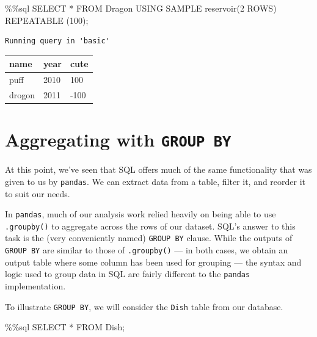 \documentclass[
  letterpaper,
  DIV=11,
  numbers=noendperiod]{scrreprt}
\newenvironment{Shaded}{\begin{snugshade}}{\end{snugshade}}
\newcommand{\DecValTok}[1]{\textcolor[rgb]{0.68,0.00,0.00}{#1}}
\newcommand{\NormalTok}[1]{\textcolor[rgb]{0.00,0.23,0.31}{#1}}
\newcommand{\OperatorTok}[1]{\textcolor[rgb]{0.37,0.37,0.37}{#1}}
\begin{document}
\begin{Shaded}
\begin{Highlighting}[]
\OperatorTok{\%\%}\NormalTok{sql}
\NormalTok{SELECT }\OperatorTok{*}
\NormalTok{FROM Dragon USING SAMPLE reservoir(}\DecValTok{2}\NormalTok{ ROWS) REPEATABLE (}\DecValTok{100}\NormalTok{)}\OperatorTok{;}
\end{Highlighting}
\end{Shaded}

\begin{verbatim}
Running query in 'basic'
\end{verbatim}

\begin{longtable}[]{@{}lll@{}}
\toprule\noalign{}
name & year & cute \\
\midrule\noalign{}
\endhead
\bottomrule\noalign{}
\endlastfoot
puff & 2010 & 100 \\
drogon & 2011 & -100 \\
\end{longtable}

\section{\texorpdfstring{Aggregating with
\texttt{GROUP\ BY}}{Aggregating with GROUP BY}}\label{aggregating-with-group-by}

At this point, we've seen that SQL offers much of the same functionality
that was given to us by \texttt{pandas}. We can extract data from a
table, filter it, and reorder it to suit our needs.

In \texttt{pandas}, much of our analysis work relied heavily on being
able to use \texttt{.groupby()} to aggregate across the rows of our
dataset. SQL's answer to this task is the (very conveniently named)
\texttt{GROUP\ BY} clause. While the outputs of \texttt{GROUP\ BY} are
similar to those of \texttt{.groupby()} --- in both cases, we obtain an
output table where some column has been used for grouping --- the syntax
and logic used to group data in SQL are fairly different to the
\texttt{pandas} implementation.

To illustrate \texttt{GROUP\ BY}, we will consider the \texttt{Dish}
table from our database.

\begin{Shaded}
\begin{Highlighting}[]
\OperatorTok{\%\%}\NormalTok{sql}
\NormalTok{SELECT }\OperatorTok{*} 
\NormalTok{FROM Dish}\OperatorTok{;}
\end{Highlighting}
\end{Shaded}
\end{document}

